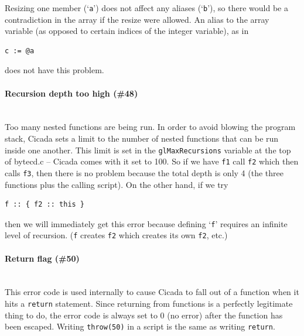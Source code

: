 \documentclass{article}
\newenvironment{code}{
       \begin{list}{}{
               \setlength{\leftmargin}{.4in}
               \setlength{\rightmargin}{0in}
               \setlength{\topsep}{.2in}
       }
       \small
       \item[] }
       { \end{list}   }
\begin{document}
\noindent Resizing one member (`\verb#a#') does not affect any aliases (`\verb#b#'), so there would be a contradiction in the array if the resize were allowed.  An alias to the array variable (as opposed to certain indices of the integer variable), as in

\begin{code} \begin{verbatim}
c := @a
\end{verbatim} \end{code}

\noindent does not have this problem.\\




\paragraph{Recursion depth too high (\#48)\\\\}

Too many nested functions are being run.  In order to avoid blowing the program stack, Cicada sets a limit to the number of nested functions that can be run inside one another.  This limit is set in the \verb#glMaxRecursions# variable at the top of bytecd.c -- Cicada comes with it set to 100.  So if we have \verb#f1# call \verb#f2# which then calls \verb#f3#, then there is no problem because the total depth is only 4 (the three functions plus the calling script).  On the other hand, if we try\\

\begin{code} \begin{verbatim}
f :: { f2 :: this }
\end{verbatim} \end{code}

\noindent then we will immediately get this error because defining `\verb#f#' requires an infinite level of recursion.  (\verb#f# creates \verb#f2# which creates its own \verb#f2#, etc.)\\




\paragraph{Return flag (\#50)\\\\}

This error code is used internally to cause Cicada to fall out of a function when it hits a \verb#return# statement.  Since returning from functions is a perfectly legitimate thing to do, the error code is always set to 0 (no error) after the function has been escaped.  Writing \verb#throw(50)# in a script is the same as writing \verb#return#.
\end{document}
